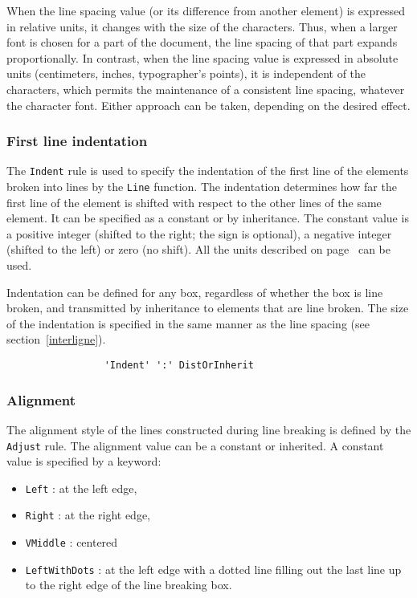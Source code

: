 When the line spacing value (or its difference from another element)
is expressed in relative units, it changes with the size of the
characters.  Thus, when a larger font is chosen for a part of the
document, the line spacing of that part expands proportionally.  In
contrast, when the line spacing value is expressed in absolute units
(centimeters, inches, typographer's points), it is independent of the
characters, which permits the maintenance of a consistent line
spacing, whatever the character font.  Either approach can be taken,
depending on the desired effect.

\subsubsection{First line indentation}

The {\tt Indent} rule is used to specify the indentation of the first
line of the elements broken into lines by the {\tt Line} function.
The indentation determines how far the first line of the element is
shifted with respect to the other lines of the same element.  It can
be specified as a constant or by inheritance.  The constant value is
a positive integer (shifted to the right; the sign is optional), a
negative integer (shifted to the left) or zero (no shift).  All the
units described on page~\pageref{unites} can be used.

Indentation can be defined for any box, regardless of whether the box
is line broken, and transmitted by inheritance to elements that are
line broken.  The size of the indentation is specified in the same
manner as the line spacing (see section~\ref{interligne}).

\begin{verbatim}
                 'Indent' ':' DistOrInherit
\end{verbatim}

\subsubsection{Alignment}

The alignment style of the lines constructed during line breaking is
defined by the {\tt Adjust} rule.  The alignment value can be a
constant or inherited.  A constant value is specified by a keyword:
\begin{itemize}
   \item {\tt Left} : at the left edge,
   \item {\tt Right} : at the right edge,
   \item {\tt VMiddle} : centered
   \item {\tt LeftWithDots} : at the left edge with a dotted line
filling out the last line up to the right edge of the line breaking box.
\end{itemize}

